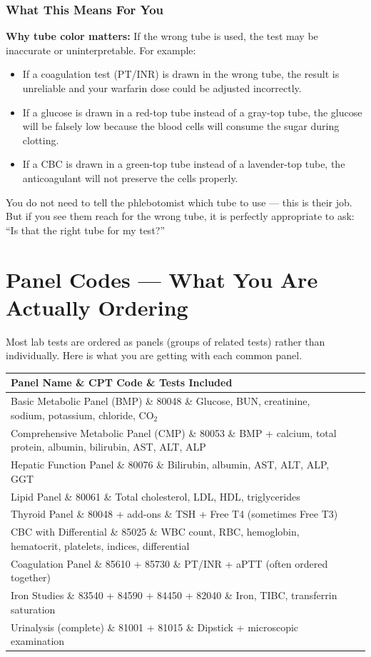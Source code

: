 \subsubsection{What This Means For You}

\textbf{Why tube color matters:} If the wrong tube is used, the test may be inaccurate or uninterpretable. For example:
\begin{itemize}
    \item If a coagulation test (PT/INR) is drawn in the wrong tube, the result is unreliable and your warfarin dose could be adjusted incorrectly.
    \item If a glucose is drawn in a red-top tube instead of a gray-top tube, the glucose will be falsely low because the blood cells will consume the sugar during clotting.
    \item If a CBC is drawn in a green-top tube instead of a lavender-top tube, the anticoagulant will not preserve the cells properly.
\end{itemize}

You do not need to tell the phlebotomist which tube to use --- this is their job. But if you see them reach for the wrong tube, it is perfectly appropriate to ask: ``Is that the right tube for my test?''

\clearpage
\section{Panel Codes --- What You Are Actually Ordering}

Most lab tests are ordered as panels (groups of related tests) rather than individually. Here is what you are getting with each common panel.

\begin{longtable}{@{}lll@{}}
\toprule
\textbf{Panel Name} \& \textbf{CPT Code} \& \textbf{Tests Included} \\
\midrule
Basic Metabolic Panel (BMP) \& 80048 \& Glucose, BUN, creatinine, sodium, potassium, chloride, CO$_2$ \\
Comprehensive Metabolic Panel (CMP) \& 80053 \& BMP + calcium, total protein, albumin, bilirubin, AST, ALT, ALP \\
Hepatic Function Panel \& 80076 \& Bilirubin, albumin, AST, ALT, ALP, GGT \\
Lipid Panel \& 80061 \& Total cholesterol, LDL, HDL, triglycerides \\
Thyroid Panel \& 80048 + add-ons \& TSH + Free T4 (sometimes Free T3) \\
CBC with Differential \& 85025 \& WBC count, RBC, hemoglobin, hematocrit, platelets, indices, differential \\
Coagulation Panel \& 85610 + 85730 \& PT/INR + aPTT (often ordered together) \\
Iron Studies \& 83540 + 84590 + 84450 + 82040 \& Iron, TIBC, transferrin saturation \\
Urinalysis (complete) \& 81001 + 81015 \& Dipstick + microscopic examination \\
\bottomrule
\end{longtable}


